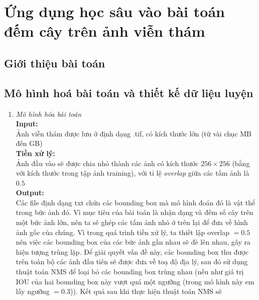 \documentclass[a4paper, 12pt]{report}
\begin{document}
\chapter{Ứng dụng học sâu vào bài toán đếm cây trên ảnh viễn thám}
\section{Giới thiệu bài toán}

\section{Mô hình hoá bài toán và thiết kế dữ liệu luyện}
\begin{enumerate}[label= \textit{\alph*)}]
\item \textit{Mô hình hóa bài toán} \\
\textbf{Input:} \\
Ảnh viễn thám được lưu ở định dạng .tif, có kích thước lớn (từ vài chục MB đến GB) \\ \textbf{Tiền xử lý:} \\
Ảnh đầu vào sẽ được chia nhỏ thành các ảnh có kích thước $256 \times 256$ (bằng với kích thước trong tập ảnh training),  với tỉ lệ \textit{overlap} giữa các tấm ảnh là $0.5$ \\
\textbf{Output:} \\
Các file định dạng txt chứa các bounding box mà mô hình đoán đó là vật thể trong bức ảnh đó.  
Vì mục tiêu của bài toán là nhận dạng và đếm số cây trên một bức ảnh lớn,  nên ta sẽ ghép các tấm ảnh nhỏ ở trên lại để đưa về hình ảnh gốc của chúng.  Vì trong quá trình tiền xử lý, ta thiết lập overlap $= 0.5$ nên việc các bounding box của các bức ảnh gần nhau sẽ đè lên nhau,  gây ra hiện tượng trùng lặp.  Để giải quyết vấn đề này,  các bounding box thu được trên toàn bộ các ảnh đầu tiên sẽ được đưa về toạ độ địa lý, sau đó sử dụng thuật toán NMS để loại bỏ các bounding box trùng nhau (nếu như giá trị IOU của hai bounding box này vượt quá một ngưỡng (trong mô hình này em lấy ngưỡng $=0.3$)).  Kết quả sau khi thực hiện thuật toán NMS sẽ 



\end{enumerate}
\end{document}

